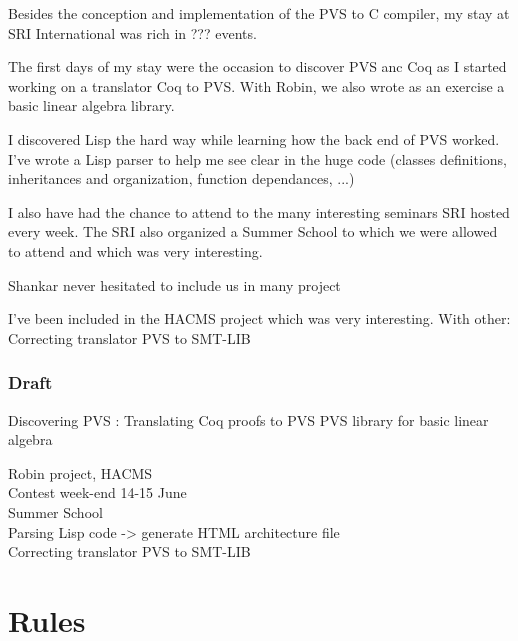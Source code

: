 \documentclass[12pt,a4paper,titlepage]{article}
\begin{document}
Besides the conception and implementation of the PVS to C compiler, my stay at SRI International was rich in ??? events.

The first days of my stay were the occasion to discover PVS anc Coq as I started working on a translator Coq to PVS. With Robin, we also wrote as an exercise a basic linear algebra library.

I discovered Lisp the hard way while learning how the back end of PVS worked. I've wrote a Lisp parser to help me see clear in the huge code (classes definitions, inheritances and organization, function dependances, ...)

I also have had the chance to attend to the many interesting seminars SRI hosted every week.
The SRI also organized a Summer School to which we were allowed to attend and which was very interesting.

Shankar never hesitated to include us in many project

I've been included in the HACMS project which was very interesting.
With other:
Correcting translator PVS to SMT-LIB




\subsubsection*{Draft}
Discovering PVS :
Translating Coq proofs to PVS
PVS library for basic linear algebra

Robin project, HACMS \\
Contest week-end 14-15 June \\
Summer School \\
Parsing Lisp code -> generate HTML architecture file\\
Correcting translator PVS to SMT-LIB
\cite{pavol}








\appendix

\newpage
\section{Rules}
\end{document}
